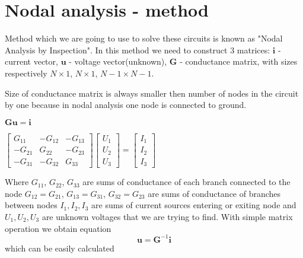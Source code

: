 \documentclass[notitlepage, a4paper, 11pt]{article}
\begin{document}
	\section{Nodal analysis - method}\label{sec:Nodal analysis}
	Method which we are going to use to solve these circuits is known as "Nodal Analysis by Inspection". In this method we need to construct 3 matrices: $\mathbf{i}$ - current vector, $\mathbf{u}$ - voltage vector(unknown), $\mathbf{G}$ - conductance matrix, with sizes respectively $\mathit{N} \times 1$, $\mathit{N} \times 1$, $\mathit{N}-1 \times \mathit{N}-1$.
	
	Size of conductance matrix is always smaller then number of nodes in the circuit by one because in nodal analysis one node is connected to ground.

		\begin{center} $\mathbf{Gu=i}$ \end{center}
		\begin{center}
			\begin{math}
				\begin{bmatrix}
					G_{11} & -G_{12} & -G_{13} \\
					-G_{21} & G_{22} & -G_{23} \\
					-G_{31} & -G_{32} & G_{33} 
				\end{bmatrix}
				\begin{bmatrix}
					U_1 \\
					U_2 \\ 
					U_3
				\end{bmatrix}
				=
				\begin{bmatrix}
					I_1 \\
					I_2 \\
					I_3
				\end{bmatrix}
			\end{math}
		\end{center}
		Where $G_{11}$, $G_{22}$, $G_{33}$ are sums of conductance of each branch connected to the node \newline $G_{12} = G_{21}$, $G_{13} = G_{31}$, $G_{32} = G_{23}$ are sums of conductance of branches between nodes \newline $I_1, I_2, I_3$ are sums of current sources entering or exiting node and $U_1, U_2, U_3$ are unknown voltages that we are trying to find.
		\newline\newline
		With simple matrix operation we obtain equation
		$$
		\mathbf{u} = \mathbf{G}^{-1}\mathbf{i}
		$$
		which can be easily calculated
\end{document}
